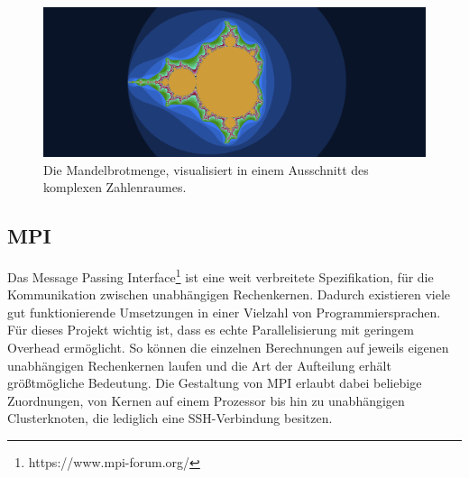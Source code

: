 \begin{figure}
    \label{mandelbrot_visualisierung_beispiel}
    \centering
        \includegraphics[width=0.9\linewidth]{img/Mandelbrot_visualization_example.png}
    \caption{Die Mandelbrotmenge, visualisiert in einem Ausschnitt des komplexen Zahlenraumes.}
\end{figure}

\subsection{MPI}

Das Message Passing Interface\footnote{https://www.mpi-forum.org/} ist eine weit verbreitete Spezifikation, für die Kommunikation zwischen unabhängigen Rechenkernen.
Dadurch existieren viele gut funktionierende Umsetzungen in einer Vielzahl von Programmiersprachen.
Für dieses Projekt wichtig ist, dass es echte Parallelisierung mit geringem Overhead ermöglicht.
So können die einzelnen Berechnungen auf jeweils eigenen unabhängigen Rechenkernen laufen und
die Art der Aufteilung erhält größtmögliche Bedeutung.
Die Gestaltung von MPI erlaubt dabei beliebige Zuordnungen, von Kernen auf einem Prozessor bis hin zu unabhängigen Clusterknoten, die lediglich eine SSH-Verbindung besitzen.


